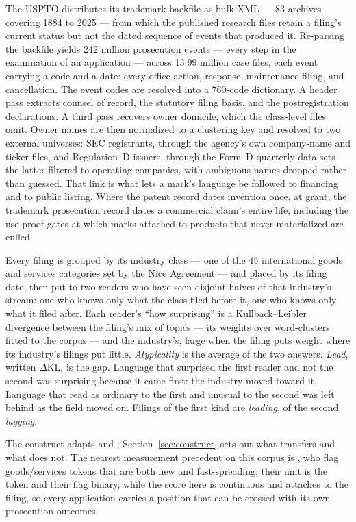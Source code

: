 \documentclass[11pt]{article}
\newcommand{\dkl}{$\Delta$KL}
\begin{document}
The USPTO distributes its trademark backfile
as bulk XML --- 83 archives covering 1884 to 2025 --- from which the
published research files retain a filing's current status but not the dated
sequence of events that produced it. Re-parsing the backfile yields 242
million prosecution events --- every step in the examination of an
application --- across 13.99 million case files, each event
carrying a code and a date: every office action, response, maintenance
filing, and cancellation. The event codes are resolved into a 760-code dictionary. A header pass
extracts counsel of record, the statutory filing basis, and the
postregistration declarations. A third pass recovers owner domicile, which
the class-level files omit. Owner names are then normalized to a clustering
key and resolved to two external universes: SEC registrants, through the
agency's own company-name and ticker files, and Regulation~D issuers,
through the Form~D quarterly data sets --- the latter filtered to operating
companies, with ambiguous names dropped rather than guessed. That link is
what lets a mark's language be followed to financing and to public listing.
Where the patent record dates invention once, at grant, the trademark
prosecution record dates a commercial claim's entire life, including the
use-proof gates at which marks attached to products that never materialized
are culled.

Every filing is grouped by its industry class --- one of the 45
international goods and services categories set by the Nice Agreement ---
and placed by its filing
date, then put to two readers who have seen disjoint halves of that
industry's stream: one who knows only what the class filed before it, one
who knows only what it filed after. Each reader's ``how surprising'' is a
Kullback--Leibler divergence between the filing's mix of topics --- its
weights over word-clusters fitted to the corpus --- and the industry's,
large when the filing puts weight where its industry's filings put little.
\emph{Atypicality} is the average of the two answers. \emph{Lead}, written
\dkl{}, is the gap. Language that surprised the first reader and not the
second was surprising because it came first: the industry moved toward it.
Language that read as ordinary to the first and unusual to the second was
left behind as the field moved on. Filings of the first kind are
\emph{leading}, of the second \emph{lagging}.

The construct adapts \citet{Murdock2017} and \citet{Barron2018};
Section~\ref{sec:construct} sets out what transfers and what does not. The
nearest measurement precedent on this corpus is \citet{vonGraevenitz2022},
who flag goods/services tokens that are both new and fast-spreading; their
unit is the token and their flag binary, while the score here is continuous
and attaches to the filing, so every application carries a position that can
be crossed with its own prosecution outcomes.
\end{document}
